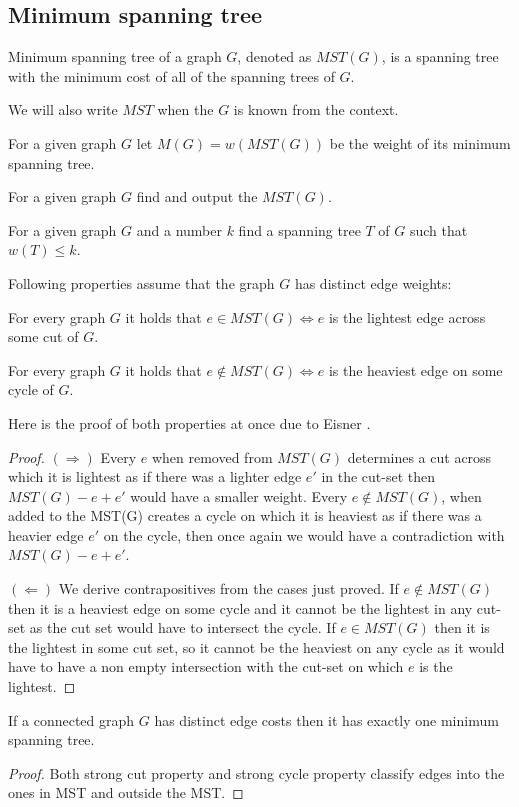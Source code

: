 \subsection{Minimum spanning tree}
\begin{definition}
    Minimum spanning tree of a graph $G$, denoted as $MST(G)$, is a spanning tree with the minimum cost of all of the spanning trees of $G$.
\end{definition}
We will also write $MST$ when the $G$ is known from the context.

\begin{definition}
For a given graph $G$ let $M(G) = w(MST(G))$ be the weight of its minimum spanning tree.
\end{definition}

\begin{problem}
    For a given graph $G$ find and output the $MST(G)$.
\end{problem}

\begin{problem}
    For a given graph $G$ and a number $k$ find a spanning tree $T$ of $G$ such that $w(T) \le k$.
\end{problem}

Following properties assume that the graph $G$ has distinct edge weights:
\begin{theorem} 
\label{cut-property}
For every graph $G$ it holds that $e \in MST(G) \iff e$ is the lightest edge across some cut of $G$.
\end{theorem}
\begin{theorem} 
\label{cycle-property}
For every graph $G$ it holds that $e \not\in MST(G) \iff e$ is the heaviest edge on some cycle of $G$.
\end{theorem}
Here is the proof of both properties at once due to Eisner \cite{eisner}.
\begin{proof}
    $(\Rightarrow)$ Every $e$ when removed from $MST(G)$ determines a cut across which it is lightest as if there was a lighter edge $e'$ in the cut-set then $MST(G) - e + e'$ would have a smaller weight. Every $e \not\in MST(G)$, when added to the MST(G) creates a cycle on which it is heaviest as if there was a heavier edge $e'$ on the cycle, then once again we would have a contradiction with $MST(G) - e + e'$.

    $(\Leftarrow)$
    We derive contrapositives from the cases just proved. If $e \not\in MST(G)$ then it is a heaviest edge on some cycle and it cannot be the lightest in any cut-set as the cut set would have to intersect the cycle. If $e \in MST(G)$ then it is the lightest in some cut set, so it cannot be the heaviest on any cycle as it would have to have a non empty intersection with the cut-set on which $e$ is the lightest.
\end{proof}

\begin{theorem} 
    If a connected graph $G$ has distinct edge costs then it has exactly one minimum spanning tree.
\end{theorem}
\begin{proof}
Both strong cut property and strong cycle property classify edges into the ones in MST and outside the MST.
\end{proof}